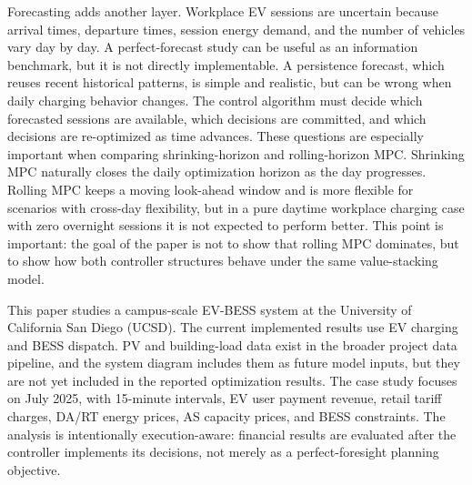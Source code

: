\documentclass[final,5p,times]{elsarticle}
\begin{document}
Forecasting adds another layer. Workplace EV sessions are uncertain because arrival times, departure times, session energy demand, and the number of vehicles vary day by day. A perfect-forecast study can be useful as an information benchmark, but it is not directly implementable. A persistence forecast, which reuses recent historical patterns, is simple and realistic, but can be wrong when daily charging behavior changes. The control algorithm must decide which forecasted sessions are available, which decisions are committed, and which decisions are re-optimized as time advances. These questions are especially important when comparing shrinking-horizon and rolling-horizon MPC. Shrinking MPC naturally closes the daily optimization horizon as the day progresses. Rolling MPC keeps a moving look-ahead window and is more flexible for scenarios with cross-day flexibility, but in a pure daytime workplace charging case with zero overnight sessions it is not expected to perform better. This point is important: the goal of the paper is not to show that rolling MPC dominates, but to show how both controller structures behave under the same value-stacking model.

This paper studies a campus-scale EV-BESS system at the University of California San Diego (UCSD). The current implemented results use EV charging and BESS dispatch. PV and building-load data exist in the broader project data pipeline, and the system diagram includes them as future model inputs, but they are not yet included in the reported optimization results. The case study focuses on July 2025, with 15-minute intervals, EV user payment revenue, retail tariff charges, DA/RT energy prices, AS capacity prices, and BESS constraints. The analysis is intentionally execution-aware: financial results are evaluated after the controller implements its decisions, not merely as a perfect-foresight planning objective.
\end{document}
